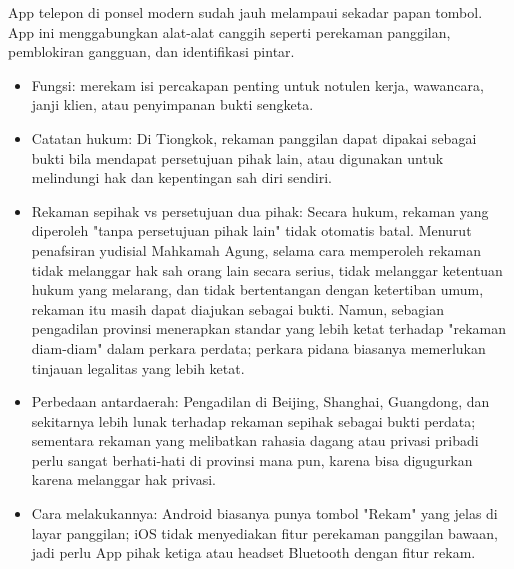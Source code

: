 


App telepon di ponsel modern sudah jauh melampaui sekadar papan tombol. App ini menggabungkan alat-alat canggih seperti perekaman panggilan, pemblokiran gangguan, dan identifikasi pintar.


\begin{itemize}
  \item Fungsi: merekam isi percakapan penting untuk notulen kerja, wawancara, janji klien, atau penyimpanan bukti sengketa.
  \item Catatan hukum: Di Tiongkok, rekaman panggilan dapat dipakai sebagai bukti bila mendapat persetujuan pihak lain, atau digunakan untuk melindungi hak dan kepentingan sah diri sendiri.
  \item Rekaman sepihak vs persetujuan dua pihak: Secara hukum, rekaman yang diperoleh "tanpa persetujuan pihak lain" tidak otomatis batal. Menurut penafsiran yudisial Mahkamah Agung, selama cara memperoleh rekaman tidak melanggar hak sah orang lain secara serius, tidak melanggar ketentuan hukum yang melarang, dan tidak bertentangan dengan ketertiban umum, rekaman itu masih dapat diajukan sebagai bukti. Namun, sebagian pengadilan provinsi menerapkan standar yang lebih ketat terhadap "rekaman diam-diam" dalam perkara perdata; perkara pidana biasanya memerlukan tinjauan legalitas yang lebih ketat.
  \item Perbedaan antardaerah: Pengadilan di Beijing, Shanghai, Guangdong, dan sekitarnya lebih lunak terhadap rekaman sepihak sebagai bukti perdata; sementara rekaman yang melibatkan rahasia dagang atau privasi pribadi perlu sangat berhati-hati di provinsi mana pun, karena bisa digugurkan karena melanggar hak privasi.
  \item Cara melakukannya: Android biasanya punya tombol "Rekam" yang jelas di layar panggilan; iOS tidak menyediakan fitur perekaman panggilan bawaan, jadi perlu App pihak ketiga atau headset Bluetooth dengan fitur rekam.
\end{itemize}

